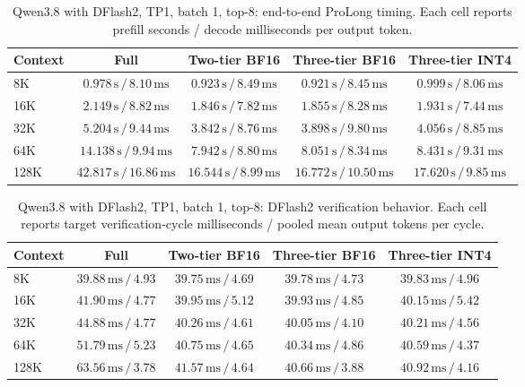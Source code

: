 \begin{table}[t]
\centering
\small
\caption{Qwen3.8 with DFlash2, TP1, batch 1, top-8: end-to-end ProLong timing. Each cell reports prefill seconds / decode milliseconds per output token.}
\label{tab:prolong-qwen38-dflash2-tp1-b1-end-to-end}
\begin{tabular}{lcccc}
\toprule
Context & Full & Two-tier BF16 & Three-tier BF16 & Three-tier INT4 \\
\midrule
8K & \(0.978\,\mathrm{s}\,/\,8.10\,\mathrm{ms}\) & \(0.923\,\mathrm{s}\,/\,8.49\,\mathrm{ms}\) & \(0.921\,\mathrm{s}\,/\,8.45\,\mathrm{ms}\) & \(0.999\,\mathrm{s}\,/\,8.06\,\mathrm{ms}\) \\
16K & \(2.149\,\mathrm{s}\,/\,8.82\,\mathrm{ms}\) & \(1.846\,\mathrm{s}\,/\,7.82\,\mathrm{ms}\) & \(1.855\,\mathrm{s}\,/\,8.28\,\mathrm{ms}\) & \(1.931\,\mathrm{s}\,/\,7.44\,\mathrm{ms}\) \\
32K & \(5.204\,\mathrm{s}\,/\,9.44\,\mathrm{ms}\) & \(3.842\,\mathrm{s}\,/\,8.76\,\mathrm{ms}\) & \(3.898\,\mathrm{s}\,/\,9.80\,\mathrm{ms}\) & \(4.056\,\mathrm{s}\,/\,8.85\,\mathrm{ms}\) \\
64K & \(14.138\,\mathrm{s}\,/\,9.94\,\mathrm{ms}\) & \(7.942\,\mathrm{s}\,/\,8.80\,\mathrm{ms}\) & \(8.051\,\mathrm{s}\,/\,8.34\,\mathrm{ms}\) & \(8.431\,\mathrm{s}\,/\,9.31\,\mathrm{ms}\) \\
128K & \(42.817\,\mathrm{s}\,/\,16.86\,\mathrm{ms}\) & \(16.544\,\mathrm{s}\,/\,8.99\,\mathrm{ms}\) & \(16.772\,\mathrm{s}\,/\,10.50\,\mathrm{ms}\) & \(17.620\,\mathrm{s}\,/\,9.85\,\mathrm{ms}\) \\
\bottomrule
\end{tabular}
\end{table}

\begin{table}[t]
\centering
\small
\caption{Qwen3.8 with DFlash2, TP1, batch 1, top-8: DFlash2 verification behavior. Each cell reports target verification-cycle milliseconds / pooled mean output tokens per cycle.}
\label{tab:prolong-qwen38-dflash2-tp1-b1-verification}
\begin{tabular}{lcccc}
\toprule
Context & Full & Two-tier BF16 & Three-tier BF16 & Three-tier INT4 \\
\midrule
8K & \(39.88\,\mathrm{ms}\,/\,4.93\) & \(39.75\,\mathrm{ms}\,/\,4.69\) & \(39.78\,\mathrm{ms}\,/\,4.73\) & \(39.83\,\mathrm{ms}\,/\,4.96\) \\
16K & \(41.90\,\mathrm{ms}\,/\,4.77\) & \(39.95\,\mathrm{ms}\,/\,5.12\) & \(39.93\,\mathrm{ms}\,/\,4.85\) & \(40.15\,\mathrm{ms}\,/\,5.42\) \\
32K & \(44.88\,\mathrm{ms}\,/\,4.77\) & \(40.26\,\mathrm{ms}\,/\,4.61\) & \(40.05\,\mathrm{ms}\,/\,4.10\) & \(40.21\,\mathrm{ms}\,/\,4.56\) \\
64K & \(51.79\,\mathrm{ms}\,/\,5.23\) & \(40.75\,\mathrm{ms}\,/\,4.65\) & \(40.34\,\mathrm{ms}\,/\,4.86\) & \(40.59\,\mathrm{ms}\,/\,4.37\) \\
128K & \(63.56\,\mathrm{ms}\,/\,3.78\) & \(41.57\,\mathrm{ms}\,/\,4.64\) & \(40.66\,\mathrm{ms}\,/\,3.88\) & \(40.92\,\mathrm{ms}\,/\,4.16\) \\
\bottomrule
\end{tabular}
\end{table}
